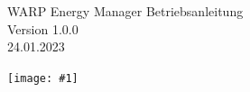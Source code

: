 \documentclass[a4paper,10pt]{article}
\title{}
\author{}
\newcommand{\gfx}[1]{\texttt{[image: \#1]}}
\begin{document}
\pagestyle{empty}
\begin{titlepage}
	\vspace*{-3.08cm}
	\colorbox{boxgray}{}
	\vfill
	\begin{center}
		\Huge
		WARP Energy Manager Betriebsanleitung\\\vspace{1cm}
		\large
		Version 1.0.0\\\vspace{0.25cm}
		24.01.2023
	\end{center}
	\vfill \gfx{./img/resized/warp-energy-manager.png}
\end{titlepage}
\newpage
\null
\newpage
\pagestyle{fancy}
\end{document}
